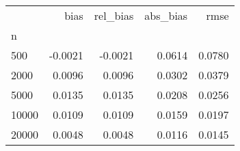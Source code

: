 \begin{tabular}{lrrrr}
\toprule
{} &    bias &  rel\_bias &  abs\_bias &   rmse \\
n     &         &           &           &        \\
\midrule
500   & -0.0021 &   -0.0021 &    0.0614 & 0.0780 \\
2000  &  0.0096 &    0.0096 &    0.0302 & 0.0379 \\
5000  &  0.0135 &    0.0135 &    0.0208 & 0.0256 \\
10000 &  0.0109 &    0.0109 &    0.0159 & 0.0197 \\
20000 &  0.0048 &    0.0048 &    0.0116 & 0.0145 \\
\bottomrule
\end{tabular}
